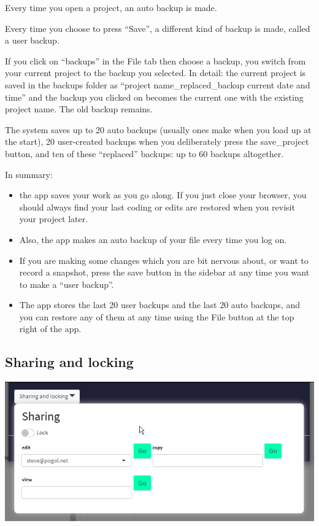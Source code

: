 \documentclass[
]{book}
\begin{document}
Every time you open a project, an auto backup is made.

Every time you choose to press ``Save'', a different kind of backup is made, called a user backup.

If you click on ``backups'' in the File tab then choose a backup, you switch from your current project to the backup you selected. In detail: the current project is saved in the backups folder as ``project name\_replaced\_backup current date and time'' and the backup you clicked on becomes the current one with the existing project name. The old backup remains.

The system saves up to 20 auto backups (usually ones make when you load up at the start), 20 user-created backups when you deliberately press the save\_project button, and ten of these ``replaced'' backups: up to 60 backups altogether.

In summary:

\begin{itemize}
\item
  the app saves your work as you go along. If you just close your browser, you should always find your last coding or edits are restored when you revisit your project later.
\item
  Also, the app makes an auto backup of your file every time you log on.
\item
  If you are making some changes which you are bit nervous about, or want to record a snapshot, press the save button in the sidebar at any time you want to make a ``user backup''.
\item
  The app stores the last 20 user backups and the last 20 auto backups, and you can restore any of them at any time using the File button at the top right of the app.
\end{itemize}

\hypertarget{sharing}{%
\subsection{Sharing and locking}\label{sharing}}

\includegraphics{_assets/110001.png}
\end{document}
